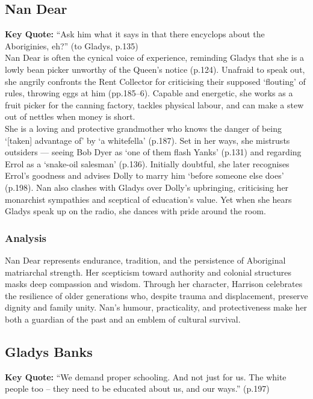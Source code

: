 \documentclass[a4paper]{article}
\begin{document}
\subsection{Nan Dear}
\textbf{Key Quote:} ``Ask him what it says in that there encyclops about the Aboriginies, eh?'' (to Gladys, p.135)\\

Nan Dear is often the cynical voice of experience, reminding Gladys that she is a lowly bean picker unworthy of the Queen’s notice (p.124). Unafraid to speak out, she angrily confronts the Rent Collector for criticising their supposed ‘flouting’ of rules, throwing eggs at him (pp.185–6). Capable and energetic, she works as a fruit picker for the canning factory, tackles physical labour, and can make a stew out of nettles when money is short.\\

She is a loving and protective grandmother who knows the danger of being ‘[taken] advantage of’ by ‘a whitefella’ (p.187). Set in her ways, she mistrusts outsiders — seeing Bob Dyer as ‘one of them flash Yanks’ (p.131) and regarding Errol as a ‘snake-oil salesman’ (p.136). Initially doubtful, she later recognises Errol’s goodness and advises Dolly to marry him ‘before someone else does’ (p.198). Nan also clashes with Gladys over Dolly’s upbringing, criticising her monarchist sympathies and sceptical of education’s value. Yet when she hears Gladys speak up on the radio, she dances with pride around the room.\\

\subsubsection{Analysis}
Nan Dear represents endurance, tradition, and the persistence of Aboriginal matriarchal strength. Her scepticism toward authority and colonial structures masks deep compassion and wisdom. Through her character, Harrison celebrates the resilience of older generations who, despite trauma and displacement, preserve dignity and family unity. Nan’s humour, practicality, and protectiveness make her both a guardian of the past and an emblem of cultural survival.\\

\subsection{Gladys Banks}
\textbf{Key Quote:} ``We demand proper schooling. And not just for us. The white people too – they need to be educated about us, and our ways.'' (p.197)\\
\end{document}
